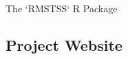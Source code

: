 \documentclass[a0,landscape]{a0poster}
\begin{document}
\begin{minipage}[t]{0.32\linewidth}
\begin{posterbox}{The `RMSTSS` R Package}
    \subsection*{\huge Project Website}
    \begin{center}
    \end{center}
\end{posterbox}

\end{minipage}
\end{document}
